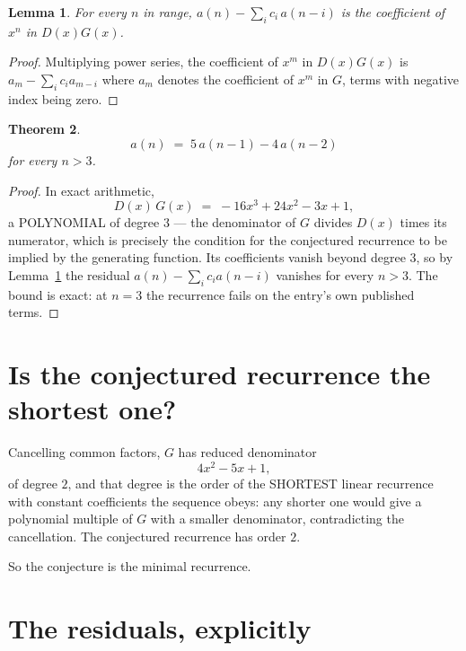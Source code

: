\documentclass[11pt,a4paper]{article}
\theoremstyle{plain}
\newtheorem{theorem}{Theorem}
\newtheorem{lemma}[theorem]{Lemma}
\theoremstyle{definition}
\begin{document}
\begin{lemma}\label{lem:key}
For every $n$ in range, $a(n)-\sum_i c_i\,a(n-i)$ is the coefficient of $x^{n}$ in
$D(x)G(x)$.
\end{lemma}

\begin{proof}
Multiplying power series, the coefficient of $x^{m}$ in $D(x)G(x)$ is
$a_m-\sum_i c_i a_{m-i}$ where $a_m$ denotes the coefficient of $x^{m}$ in $G$, terms with
negative index being zero.
\end{proof}

\begin{theorem}
\[
a(n)\;=\;5\,a(n-1) - 4\,a(n-2)
\]
for every $n>3$.
\end{theorem}

\begin{proof}
In exact arithmetic,
\[
D(x)\,G(x)\;=\;- 16 x^{3} + 24 x^{2} - 3 x + 1,
\]
a POLYNOMIAL of degree $3$ --- the denominator of $G$ divides $D(x)$ times its numerator,
which is precisely the condition for the conjectured recurrence to be implied by the
generating function. Its coefficients vanish beyond degree $3$, so by
Lemma~\ref{lem:key} the residual $a(n)-\sum_ic_ia(n-i)$ vanishes for every
$n>3$. The bound is exact: at $n=3$ the recurrence fails on the entry's own published terms.
\end{proof}

\section{Is the conjectured recurrence the shortest one?}

Cancelling common factors, $G$ has reduced denominator
\[
4 x^{2} - 5 x + 1,
\]
of degree $2$, and that degree is the order of the SHORTEST linear recurrence with
constant coefficients the sequence obeys: any shorter one would give a polynomial multiple of
$G$ with a smaller denominator, contradicting the cancellation. The conjectured recurrence has
order $2$.

So the conjecture is the minimal recurrence.

\section{The residuals, explicitly}
\end{document}
